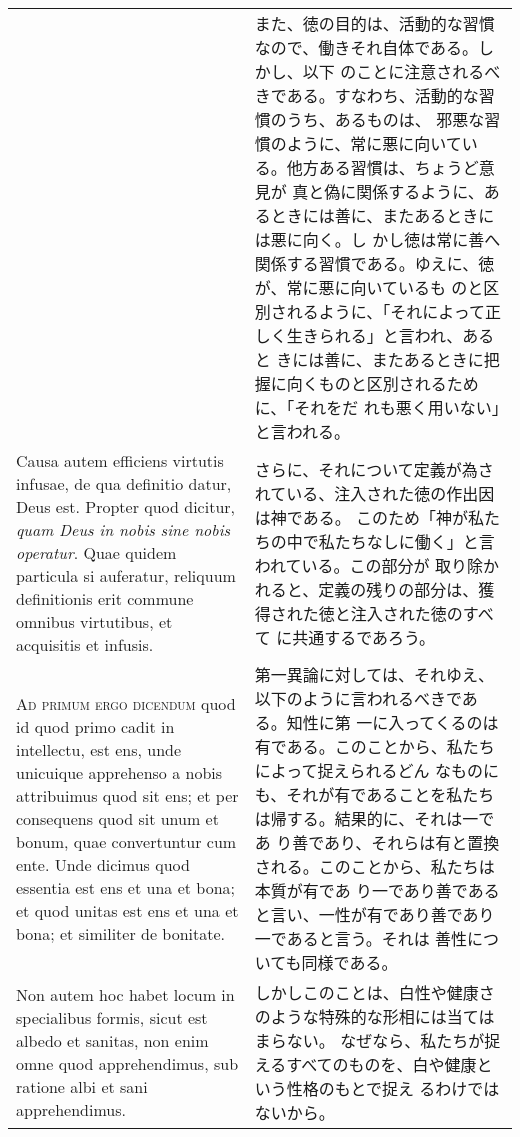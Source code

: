 \documentclass[10pt]{jsarticle}
\begin{document}
\begin{longtable}{p{21em}p{21em}}
&

また、徳の目的は、活動的な習慣なので、働きそれ自体である。しかし、以下
のことに注意されるべきである。すなわち、活動的な習慣のうち、あるものは、
邪悪な習慣のように、常に悪に向いている。他方ある習慣は、ちょうど意見が
真と偽に関係するように、あるときには善に、またあるときには悪に向く。し
かし徳は常に善へ関係する習慣である。ゆえに、徳が、常に悪に向いているも
のと区別されるように、「それによって正しく生きられる」と言われ、あると
きには善に、またあるときに把握に向くものと区別されるために、「それをだ
れも悪く用いない」と言われる。

\\

Causa autem efficiens virtutis infusae, de qua definitio datur, Deus
est. Propter quod dicitur, {\itshape quam Deus in nobis sine nobis
operatur}. Quae quidem particula si auferatur, reliquum definitionis
erit commune omnibus virtutibus, et acquisitis et infusis.

&

さらに、それについて定義が為されている、注入された徳の作出因は神である。
このため「神が私たちの中で私たちなしに働く」と言われている。この部分が
取り除かれると、定義の残りの部分は、獲得された徳と注入された徳のすべて
に共通するであろう。

\\

{\scshape Ad primum ergo dicendum} quod id quod primo cadit in
intellectu, est ens, unde unicuique apprehenso a nobis attribuimus
quod sit ens; et per consequens quod sit unum et bonum, quae
convertuntur cum ente. Unde dicimus quod essentia est ens et una et
bona; et quod unitas est ens et una et bona; et similiter de bonitate.

&

第一異論に対しては、それゆえ、以下のように言われるべきである。知性に第
一に入ってくるのは有である。このことから、私たちによって捉えられるどん
なものにも、それが有であることを私たちは帰する。結果的に、それは一であ
り善であり、それらは有と置換される。このことから、私たちは本質が有であ
り一であり善であると言い、一性が有であり善であり一であると言う。それは
善性についても同様である。

\\

Non autem hoc habet locum in specialibus formis, sicut est albedo et
sanitas, non enim omne quod apprehendimus, sub ratione albi et sani
apprehendimus. 

&

しかしこのことは、白性や健康さのような特殊的な形相には当てはまらない。
なぜなら、私たちが捉えるすべてのものを、白や健康という性格のもとで捉え
るわけではないから。


\end{longtable}
\end{document}
